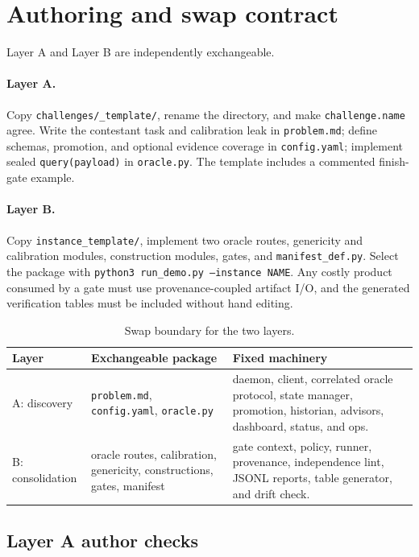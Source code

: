 \documentclass[11pt]{article}
\newcommand{\code}[1]{\texttt{#1}}
\begin{document}
\section{Authoring and swap contract}

Layer A and Layer B are independently exchangeable.

\paragraph{Layer A.}
Copy \code{challenges/\_template/}, rename the directory, and make
\code{challenge.name} agree.  Write the contestant task and calibration leak
in \code{problem.md}; define schemas, promotion, and optional evidence
coverage in \code{config.yaml}; implement sealed \code{query(payload)} in
\code{oracle.py}.  The template includes a commented finish-gate example.

\paragraph{Layer B.}
Copy \code{instance\_template/}, implement two oracle routes, genericity and
calibration modules, construction modules, gates, and
\code{manifest\_def.py}.  Select the package with
\code{python3 run\_demo.py --instance NAME}.  Any costly product consumed by
a gate must use provenance-coupled artifact I/O, and the generated
verification tables must be included without hand editing.

\begin{table}[htbp]
\centering
\small
\caption{Swap boundary for the two layers.}
\label{tab:swap}
\begin{tabularx}{\textwidth}{@{}p{}Y Y@{}}
\toprule
Layer & Exchangeable package & Fixed machinery \\
\midrule
A: discovery &
\code{problem.md}, \code{config.yaml}, \code{oracle.py} &
daemon, client, correlated oracle protocol, state manager, promotion,
historian, advisors, dashboard, status, and ops. \\
B: consolidation &
oracle routes, calibration, genericity, constructions, gates, manifest &
gate context, policy, runner, provenance, independence lint, JSONL reports,
table generator, and drift check. \\
\bottomrule
\end{tabularx}
\end{table}

\subsection{Layer A author checks}
\end{document}
